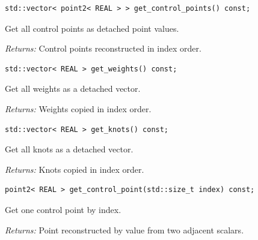 \par\noindent\begin{minipage}{\linewidth}
\begin{lstlisting}[style=apireference]
std::vector< point2< REAL > > get_control_points() const;
\end{lstlisting}
{\footnotesize Get all control points as detached point values.\par}
{\footnotesize\textit{Returns:} Control points reconstructed in index order.\par}
\end{minipage}\par\vspace{1pt}
\par\noindent\begin{minipage}{\linewidth}
\begin{lstlisting}[style=apireference]
std::vector< REAL > get_weights() const;
\end{lstlisting}
{\footnotesize Get all weights as a detached vector.\par}
{\footnotesize\textit{Returns:} Weights copied in index order.\par}
\end{minipage}\par\vspace{1pt}
\par\noindent\begin{minipage}{\linewidth}
\begin{lstlisting}[style=apireference]
std::vector< REAL > get_knots() const;
\end{lstlisting}
{\footnotesize Get all knots as a detached vector.\par}
{\footnotesize\textit{Returns:} Knots copied in index order.\par}
\end{minipage}\par\vspace{1pt}
\par\noindent\begin{minipage}{\linewidth}
\begin{lstlisting}[style=apireference]
point2< REAL > get_control_point(std::size_t index) const;
\end{lstlisting}
{\footnotesize Get one control point by index.\par}
{\footnotesize\textit{Returns:} Point reconstructed by value from two adjacent scalars.\par}
\end{minipage}\par\vspace{1pt}
